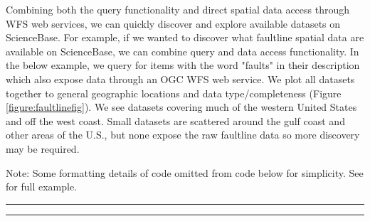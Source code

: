 Combining both the query functionality and direct spatial data access through WFS web services, 
we can quickly discover and explore available datasets on ScienceBase. For example, if we wanted to 
discover what faultline spatial data are available on ScienceBase, we can combine 
query and data access functionality. In the below example, 
we query for items with the word "faults" in their description which also expose data 
through an OGC WFS web service. We plot all datasets together to general geographic locations
and data type/completeness (Figure \ref{figure:faultlinefig}). We see datasets covering much of the western United States and off the west coast. 
Small datasets are scattered around the gulf coast and other areas of the U.S., but none expose the 
raw faultline data so more discovery may be required. 

Note: Some formatting details of code
omitted from code below for simplicity. See  
for full example.

\noindent\rule{\textwidth}{0.4pt}
\noindent\rule{\textwidth}{0.4pt}

